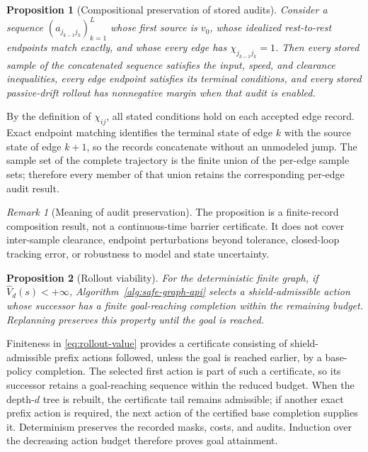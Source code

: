 \documentclass{IEEEtaes}
\newtheorem{proposition}{Proposition}
\theoremstyle{remark}
\newtheorem{remark}{Remark}
\theoremstyle{plain}
\begin{document}
\begin{proposition}[Compositional preservation of stored audits]
\label{prop:audit-composition}
Consider a sequence $(a_{j_{k-1}j_k})_{k=1}^{L}$ whose first source is $v_0$, whose idealized rest-to-rest endpoints match exactly, and whose every edge has $\chi_{j_{k-1}j_k}=1$. Then every stored sample of the concatenated sequence satisfies the input, speed, and clearance inequalities, every edge endpoint satisfies its terminal conditions, and every stored passive-drift rollout has nonnegative margin when that audit is enabled.
\end{proposition}

\begin{IEEEproof}
By the definition of $\chi_{ij}$, all stated conditions hold on each accepted edge record. Exact endpoint matching identifies the terminal state of edge $k$ with the source state of edge $k+1$, so the records concatenate without an unmodeled jump. The sample set of the complete trajectory is the finite union of the per-edge sample sets; therefore every member of that union retains the corresponding per-edge audit result.
\end{IEEEproof}

\begin{remark}[Meaning of audit preservation]
The proposition is a finite-record composition result, not a continuous-time barrier certificate. It does not cover inter-sample clearance, endpoint perturbations beyond tolerance, closed-loop tracking error, or robustness to model and state uncertainty.
\end{remark}

\begin{proposition}[Rollout viability]
\label{prop:rollout-viability}
For the deterministic finite graph, if $\widehat V_d(s)<+\infty$, Algorithm~\ref{alg:safe-graph-api} selects a shield-admissible action whose successor has a finite goal-reaching completion within the remaining budget. Replanning preserves this property until the goal is reached.
\end{proposition}

\begin{IEEEproof}
Finiteness in \eqref{eq:rollout-value} provides a certificate consisting of shield-admissible prefix actions followed, unless the goal is reached earlier, by a base-policy completion. The selected first action is part of such a certificate, so its successor retains a goal-reaching sequence within the reduced budget. When the depth-$d$ tree is rebuilt, the certificate tail remains admissible; if another exact prefix action is required, the next action of the certified base completion supplies it. Determinism preserves the recorded masks, costs, and audits. Induction over the decreasing action budget therefore proves goal attainment.
\end{IEEEproof}
\end{document}
